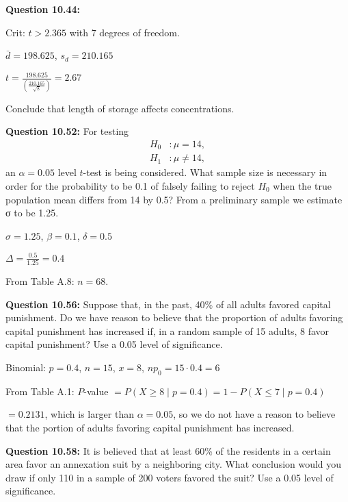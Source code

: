 \documentclass{article}
\begin{document}
\textbf{Question 10.44:}
\begin{description}
    \item Crit: $t>2.365$ with 7 degrees of freedom.
    \item $\bar{d}=198.625$, $s_d=210.165$
    \item $t=\frac{198.625}{(\frac{210.165}{\sqrt{8}})}=2.67$
    \item Conclude that length of storage affects concentrations.
\end{description}

\textbf{Question 10.52:}
For testing
\begin{align*}
    H_0 &: \mu = 14,\\
    H_1 &: \mu \not= 14,
\end{align*}
an $\alpha = 0.05$ level $t$-test is being considered. What 
sample size is necessary in order for the probability to be
0.1 of falsely failing to reject $H_0$ when the true 
population mean differs from 14 by 0.5? From a preliminary
sample we estimate σ to be 1.25.
\begin{description}
    \item $\sigma=1.25$, $\beta=0.1$, $\delta=0.5$
    \item $\Delta=\frac{0.5}{1.25} = 0.4$
    \item From Table A.8: $n=68$.
\end{description}

\textbf{Question 10.56:}
Suppose that, in the past, 40\% of all adults
favored capital punishment. Do we have reason to
believe that the proportion of adults favoring capital
punishment has increased if, in a random sample of 15
adults, 8 favor capital punishment? Use a 0.05 level of
significance.
\begin{description}
    \item Binomial: $p=0.4$, $n=15$, $x=8$, $np_0=15\cdot 0.4 = 6$
    \item From Table A.1: $P$-value $=P(X\geq 8 \mid p=0.4) = 1 - P(X\leq 7 \mid p=0.4)$
    \item $ = 0.2131$, which is larger than $\alpha =0.05$, so we do not have a reason to
    believe that the portion of adults favoring capital punishment has increased.
\end{description}

\textbf{Question 10.58:}
It is believed that at least 60\% of the residents
in a certain area favor an annexation suit by a 
neighboring city. What conclusion would you draw if only
110 in a sample of 200 voters favored the suit? Use a
0.05 level of significance.
\newline
\end{document}
